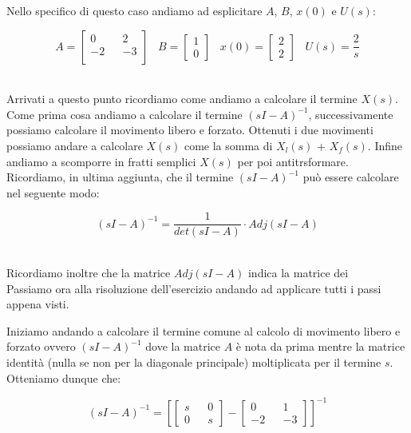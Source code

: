 \documentclass[../main.tex]{subfiles}
\begin{document}
Nello specifico di questo caso andiamo ad esplicitare $A$, $B$, $x(0)$ e $U(s)$:

\[ A = \begin{bmatrix} 0 && 2 \\ -2 && -3 \\ \end{bmatrix}  \hspace{10pt} B =  \begin{bmatrix} 1 \\ 0 \end{bmatrix} \hspace{10pt} x(0) =  \begin{bmatrix} 2 \\ 2 \end{bmatrix} \hspace{10pt}  U(s) =  \frac{2}{s} \]\

Arrivati a questo punto ricordiamo come andiamo a calcolare il termine $X(s)$. Come prima cosa andiamo a calcolare il termine $(sI - A)^{-1}$, successivamente possiamo calcolare il movimento libero e forzato. Ottenuti i due movimenti possiamo andare a calcolare $X(s)$ come la somma di $X_l(s)$ + $X_f(s)$. Infine andiamo a scomporre in fratti semplici $X(s)$ per poi antitrsformare.\\

Ricordiamo, in ultima aggiunta, che il termine $(sI - A)^{-1}$ può essere calcolare nel seguente modo:

\[  (sI - A)^{-1} = \frac{1}{\unit{det}(sI - A)} \cdot \unit{Adj}(sI - A) \]\


Ricordiamo inoltre che la matrice $\unit{Adj}(sI - A)$ indica la matrice dei %
\\

Passiamo ora alla risoluzione dell'esercizio andando ad applicare tutti i passi appena visti.

Iniziamo andando a calcolare il termine comune al calcolo di movimento libero e forzato ovvero $(sI - A)^{-1}$ dove la matrice $A$ è nota da prima mentre la matrice identità (nulla se non per la diagonale principale) moltiplicata per il termine $s$. Otteniamo dunque che:

\[  (sI - A)^{-1} =  \left[ \begin{bmatrix} s && 0 \\ 0 && s \end{bmatrix} - \begin{bmatrix} 0 && 1 \\ -2 && -3 \end{bmatrix} \right] ^{-1}   \]\
\end{document}
